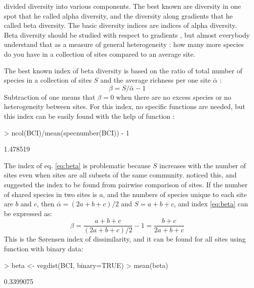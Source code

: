 \documentclass[a4paper,10pt,twocolumn]{article}
\begin{document}
\citet{Whittaker60} divided diversity into various components. The
best known are diversity in one spot that he called alpha diversity,
and the diversity along gradients that he called beta diversity. The
basic diversity indices are indices of alpha diversity. Beta diversity
should be studied with respect to gradients \citep{Whittaker60}, but
almost everybody understand that as a measure of general heterogeneity
\citep{Tuomisto10a, Tuomisto10b}: how many more species do you have in
a collection of sites compared to an average site.

The best known index of beta diversity is based on the ratio of total
number of species in a collection of sites $S$ and the average
richness per one site $\bar \alpha$ \citep{Tuomisto10a}:
\begin{equation}
  \label{eq:beta}
  \beta = S/\bar \alpha - 1
\end{equation}
Subtraction of one means that $\beta = 0$ when there are no excess
species or no heterogeneity between sites. For this index, no specific
functions are needed, but this index can be easily found with the help
of  function :
\begin{Schunk}
\begin{Sinput}
> ncol(BCI)/mean(specnumber(BCI)) - 1
\end{Sinput}
\begin{Soutput}
[1] 1.478519
\end{Soutput}
\end{Schunk}

The index of eq. \ref{eq:beta} is problematic because $S$ increases
with the number of sites even when sites are all subsets of the same
community.  \citet{Whittaker60} noticed this, and suggested the index
to be found from pairwise comparison of sites. If the number of shared
species in two sites is $a$, and the numbers of species unique to each
site are $b$ and $c$, then $\bar \alpha = (2a + b + c)/2$ and $S =
a+b+c$, and index \ref{eq:beta} can be expressed as:
\begin{equation}
  \label{eq:betabray}
  \beta = \frac{a+b+c}{(2a+b+c)/2} - 1 = \frac{b+c}{2a+b+c}
\end{equation}
This is the S{\o}rensen index of dissimilarity, and it can be found
for all sites using  function  with
binary data:
\begin{Schunk}
\begin{Sinput}
> beta <- vegdist(BCI, binary=TRUE)
> mean(beta)
\end{Sinput}
\begin{Soutput}
[1] 0.3399075
\end{Soutput}
\end{Schunk}
\end{document}
